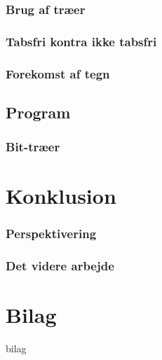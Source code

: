 \documentclass[12pt,a4paper]{report}
\begin{document}
	\subsection{Brug af træer}
	   
   
	\subsection{Tabsfri kontra ikke tabsfri}
	

	\subsection{Forekomst af tegn}
	

   \section{Program}
   
   \subsection{Bit-træer}
   

\chapter{Konklusion}

           

           \subsection{Perspektivering}
	

          \subsection{Det videre arbejde}
	




\chapter*{Bilag}
 {bilag}
\end{document}

